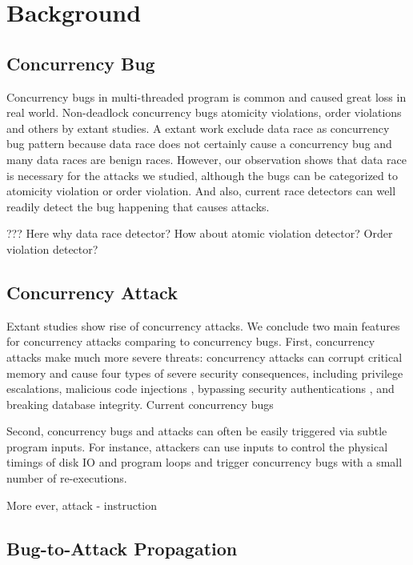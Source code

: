 \section{Background}\label{sec:background}

\subsection{Concurrency Bug}

Concurrency bugs in multi-threaded program is common and caused great loss in real world. 
Non-deadlock concurrency bugs 
atomicity violations\cite{}, order violations\cite{} and others by extant studies\cite{lu:concurrency-bugs,conmem:asplos10}. 
A extant work exclude data race as concurrency bug pattern 
because data race does not certainly cause a concurrency bug\cite{lu:concurrency-bugs} and many data races are benign races. 
However, our observation shows that data race is necessary for the attacks we studied, 
although the bugs can be categorized to atomicity violation or order violation. 
And also, current race detectors can well readily detect the bug happening that causes attacks.

??? Here why data race detector? How about atomic violation detector? Order violation detector?
 
\subsection{Concurrency Attack}
Extant studies \cite{con:hotpar12, acidrain:sigmod17} show rise of concurrency 
attacks. We conclude two main features for concurrency attacks comparing to concurrency bugs. 
First, concurrency attacks make much more severe threats:
concurrency attacks can corrupt critical memory and cause four
types of severe security consequences, including privilege escalations\cite{uselib-bug-12791, mysql-bug-24988},
malicious code injections \cite{msiexploit},  bypassing security authentications\cite{cve-2010-0923, cve-2008-0034, cve-2010-1754}
, and breaking database integrity\cite{acidrain:sigmod17}. 
Current concurrency bugs 


Second, concurrency bugs and attacks can often be easily
triggered via subtle program inputs. For instance, attackers
can use inputs to control the physical timings of disk
IO and program loops and trigger concurrency bugs with a
small number of re-executions. 

More ever, attack - instruction


\subsection{Bug-to-Attack Propagation}





